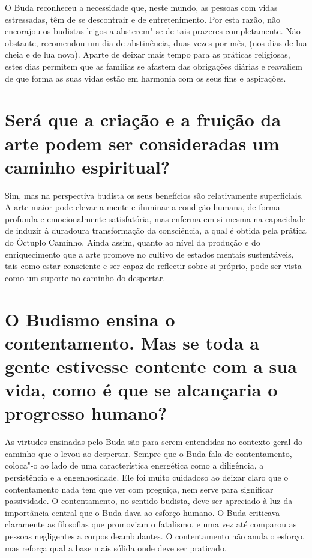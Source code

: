 O Buda reconheceu a necessidade que, neste mundo, as pessoas com vidas
estressadas, têm de se descontrair e de entretenimento. Por esta razão,
não encorajou os budistas leigos a absterem"-se de tais prazeres
completamente. Não obstante, recomendou um dia de abstinência, duas
vezes por mês, (nos dias de lua cheia e de lua nova). Aparte de deixar
mais tempo para as práticas religiosas, estes dias permitem que as
famílias se afastem das obrigações diárias e reavaliem de que forma as
suas vidas estão em harmonia com os seus fins e aspirações.

\section{Será que a criação e a fruição da arte podem ser consideradas um
  caminho espiritual?}

Sim, mas na perspectiva budista os seus benefícios são relativamente
superficiais. A arte maior pode elevar a mente e iluminar a condição
humana, de forma profunda e emocionalmente satisfatória, mas enferma em
si mesma na capacidade de induzir à duradoura transformação da
consciência, a qual é obtida pela prática do Óctuplo Caminho. Ainda
assim, quanto ao nível da produção e do enriquecimento que a arte
promove no cultivo de estados mentais sustentáveis, tais como estar
consciente e ser capaz de reflectir sobre si próprio, pode ser vista
como um suporte no caminho do despertar.

\section{O Budismo ensina o contentamento. Mas se toda a gente estivesse
  contente com a sua vida, como é que se alcançaria o progresso humano?}

As virtudes ensinadas pelo Buda são para serem entendidas no contexto
geral do caminho que o levou ao despertar. Sempre que o Buda fala de
contentamento, coloca"-o ao lado de uma característica energética como a
diligência, a persistência e a engenhosidade. Ele foi muito cuidadoso ao
deixar claro que o contentamento nada tem que ver com preguiça, nem
serve para significar passividade. O contentamento, no sentido budista,
deve ser apreciado à luz da importância central que o Buda dava ao
esforço humano. O Buda criticava claramente as filosofias que promoviam
o fatalismo, e uma vez até comparou as pessoas negligentes a corpos
deambulantes. O contentamento não anula o esforço, mas reforça qual a
base mais sólida onde deve ser praticado.

